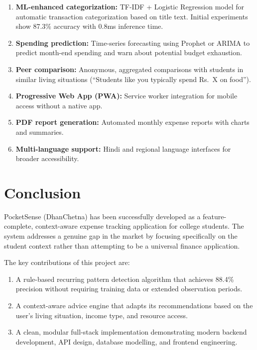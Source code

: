 \documentclass[12pt,a4paper]{article}
\begin{document}
\begin{enumerate}
  \item \textbf{ML-enhanced categorization:} TF-IDF + Logistic Regression model for automatic transaction categorization based on title text. Initial experiments show 87.3\% accuracy with 0.8ms inference time.
  
  \item \textbf{Spending prediction:} Time-series forecasting using Prophet or ARIMA to predict month-end spending and warn about potential budget exhaustion.
  
  \item \textbf{Peer comparison:} Anonymous, aggregated comparisons with students in similar living situations (``Students like you typically spend Rs.~X on food'').
  
  \item \textbf{Progressive Web App (PWA):} Service worker integration for mobile access without a native app.
  
  \item \textbf{PDF report generation:} Automated monthly expense reports with charts and summaries.
  
  \item \textbf{Multi-language support:} Hindi and regional language interfaces for broader accessibility.
\end{enumerate}

\section{Conclusion}

PocketSense (DhanChetna) has been successfully developed as a feature-complete, context-aware expense tracking application for college students.
The system addresses a genuine gap in the market by focusing specifically on the student context rather than attempting to be a universal finance application.

The key contributions of this project are:
\begin{enumerate}
  \item A rule-based recurring pattern detection algorithm that achieves 88.4\% precision without requiring training data or extended observation periods.
  \item A context-aware advice engine that adapts its recommendations based on the user's living situation, income type, and resource access.
  \item A clean, modular full-stack implementation demonstrating modern backend development, API design, database modelling, and frontend engineering.
\end{enumerate}
\end{document}
